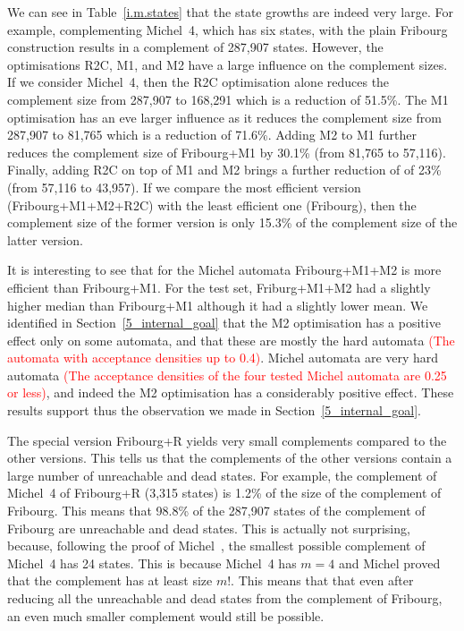 
We can see in Table~\ref{i.m.states} that the state growths are indeed very large. For example, complementing Michel~4, which has six states, with the plain Fribourg construction results in a complement of 287,907 states. However, the optimisations R2C, M1, and M2 have a large influence on the complement sizes. If we consider Michel~4, then the R2C optimisation alone reduces the complement size from 287,907 to 168,291 which is a reduction of 51.5\%. The M1 optimisation has an eve larger influence as it reduces the complement size from 287,907 to 81,765 which is a reduction of 71.6\%. Adding M2 to M1 further reduces the complement size of Fribourg+M1 by 30.1\% (from 81,765 to 57,116). Finally, adding R2C on top of M1 and M2 brings a further reduction of of 23\% (from 57,116 to 43,957). If we compare the most efficient version (Fribourg+M1+M2+R2C) with the least efficient one (Fribourg), then the complement size of the former version is only 15.3\% of the complement size of the latter version.

It is interesting to see that for the Michel automata Fribourg+M1+M2 is more efficient than Fribourg+M1. For the \goal{} test set, Friburg+M1+M2 had a slightly higher median than Fribourg+M1 although it had a slightly lower mean. We identified in Section~\ref{5_internal_goal} that the M2 optimisation has a positive effect only on some automata, and that these are mostly the hard automata \textcolor{red}{(The automata with acceptance densities up to 0.4)}. Michel automata are very hard automata \textcolor{red}{(The acceptance densities of the four tested Michel automata are 0.25 or less)}, and indeed the M2 optimisation has a considerably positive effect. These results support thus the observation we made in Section~\ref{5_internal_goal}.

The special version Fribourg+R yields very small complements compared to the other versions. This tells us that the complements of the other versions contain a large number of unreachable and dead states. For example, the complement of Michel~4 of Fribourg+R (3,315 states) is 1.2\% of the size of the complement of Fribourg. This means that 98.8\% of the 287,907 states of the complement of Fribourg are unreachable and dead states. This is actually not surprising, because, following the proof of Michel~\cite{michel1988}\cite{1996_thomas}, the smallest possible complement of Michel~4 has 24 states. This is because Michel~4 has $m=4$ and Michel proved that the complement has at least size $m!$. This means that that even after reducing all the unreachable and dead states from the complement of Fribourg, an even much smaller complement would still be possible.

